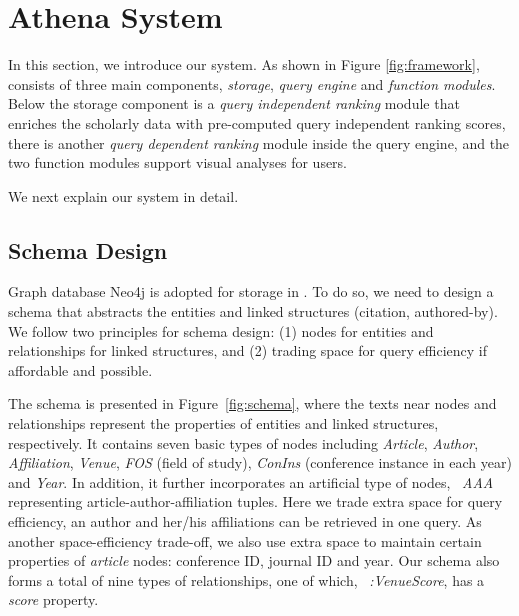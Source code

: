 \section{ Athena System}
\label{sec-system}

In this section, we introduce our \oursystem system.
As shown in Figure \ref{fig:framework}, \oursystem consists of three main components, \ie \emph{storage}, \emph{query engine} and {\em function modules}.
Below the storage component is a {\em query independent ranking} module that enriches the scholarly data with pre-computed query independent ranking scores,  there is another {\em query dependent ranking} module inside the query engine, and the two function modules support visual analyses for users.



We next explain our system in detail.





\subsection{Schema Design} \label{subsec:schema}

Graph database Neo4j is adopted for storage in \oursystem. To do so, we need to design a schema that abstracts the entities and linked structures (\eg citation, authored-by).
We follow two principles for schema design: (1) nodes for entities and relationships for linked structures, and (2) trading space for query efficiency if affordable and possible.


The schema is presented in Figure~\ref{fig:schema}, where the texts near nodes and relationships represent the properties of entities and linked structures, respectively.
It contains seven basic types of nodes including {\em Article}, {\em Author}, {\em Affiliation}, {\em Venue}, {\em FOS} (field of study), {\em ConIns} (conference instance in each year) and {\em Year}.
In addition, it further incorporates an artificial type of nodes, \ie~{\em AAA} representing article-author-affiliation tuples. Here we trade extra space for query efficiency, \ie an author and her/his affiliations can be retrieved in one query.
As another space-efficiency trade-off, we also use extra space to maintain certain properties of  {\em article} nodes: conference ID, journal ID and year.
%
Our schema also forms a total of nine types of relationships, one of which, \ie~{\em :VenueScore}, has a {\em score} property.



